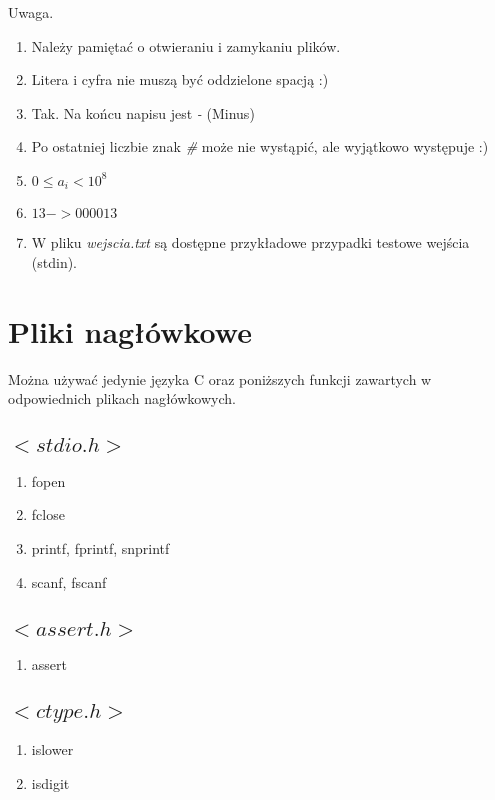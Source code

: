 \documentclass[paper=a4, fontsize=11pt]{article}
\begin{document}
Uwaga. 
\begin{enumerate}
\item Należy pamiętać o otwieraniu i zamykaniu plików.
\item Litera i cyfra nie muszą być oddzielone spacją :)
\item Tak. Na końcu napisu jest \textit{-} (Minus)
\item Po ostatniej liczbie znak \textit{\#} może nie wystąpić, ale wyjątkowo występuje :)
\item $0 \le a_i < 10^8 $
\item $13 -> 000013$
\item W pliku \textit{wejscia.txt} są dostępne przykładowe przypadki testowe wejścia (stdin).
\end{enumerate}

\section{Pliki nagłówkowe}
Można używać jedynie języka C oraz poniższych funkcji zawartych w odpowiednich plikach nagłówkowych. 

\subsection{$<stdio.h>$}
\begin{enumerate}
\item fopen
\item fclose
\item printf, fprintf, snprintf
\item scanf, fscanf
\end{enumerate}

\subsection{$<assert.h>$}
\begin{enumerate}
\item assert
\end{enumerate}

\subsection{$<ctype.h>$}
\begin{enumerate}
\item islower
\item isdigit
\end{enumerate}
\end{document}
